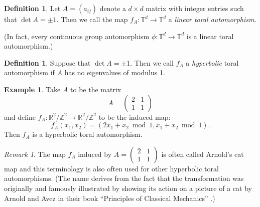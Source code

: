 \documentclass[12pt]{article}
\theoremstyle{definition}
\newtheorem{definition}[theorem]{Definition}
\newtheorem{example}[theorem]{Example}
\theoremstyle{remark}
\newtheorem{remark}[theorem]{Remark}
\begin{document}
\begin{definition}
Let $A = (a_{ij})$ denote a $d \times d$ matrix with integer entries such that
$\det A = \pm1$.  Then we call the map $f_{A} : \mathbb T^d
\rightarrow \mathbb T^d$ a {\it linear toral automorphism}.  
\end{definition}

(In fact, every continuous group automorphism $\phi : \mathbb T^d \to \mathbb T^d$ is 
a linear toral automorphism.)

\begin{definition}
Suppose that $\mathop{\mathrm{det}} A = \pm 1$.  Then we call $f_A$ a
{\it  hyperbolic} toral automorphism if $A$ has no eigenvalues of
modulus 1. 
\end{definition}

\begin{example}
Take $A$ to be the matrix
\[
 A = \left( \begin{array}{cc} 2 & 1 \\ 1 & 1 \end{array} \right)
\]
and define $f_A : \mathbb R^{2} / \mathbb Z^{2} \rightarrow \mathbb R^{2}/\mathbb Z^{2}$ to be
the induced map:
\[
 f_A(x_{1}, x_{2}) = (2x_{1}+x_{2} \bmod 1, x_{1}+x_{2} \bmod 1).
\]
Then $f_A$ is a hyperbolic toral automorphism.
\end{example}

\begin{remark}
The map $f_A$ induced by $A = \left( \begin{array}{cc} 2 & 1 \\ 1 & 1 \end{array} \right)$ is often called Arnold's
cat map and this terminology is also often used for other hyperbolic
toral automorphisms. (The name derives from the fact that the transformation was originally and famously illustrated
by showing its action on a picture of a cat by Arnold and Avez in their book ``Principles of Classical Mechanics'' \cite{AA68}.)

\end{remark}
\end{document}
